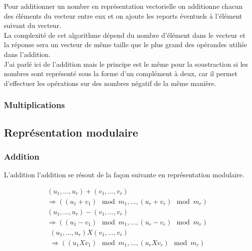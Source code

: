 \documentclass[letterpaper]{article}
\begin{document}
Pour additionner un nombre en représentation vectorielle on additionne chacun
des éléments du vecteur entre eux et on ajoute les reports éventuels à
l'élément suivant du vecteur. \\

La complexité de cet algorithme dépend du nombre d'élément dans le vecteur et
la réponse sera un vecteur de même taille que le plus grand des opérandes
utiliśe dans l'addition.\\

J'ai parlé ici de l'addition mais le principe est le même pour la soustraction
si les nombres sont représenté sous la forme d'un complément à deux, car il
permet d'effectuer les opérations sur des nombres négatif de la même
manière\cite{wikicomplementtwo}.

\subsubsection{Multiplications}



\subsection{Représentation modulaire}

\subsubsection{Addition}

L'addition l'addition se résout de la façon suivante en représentation
modulaire.

\begin{equation}
  \begin{split}
    (u_1, \dots, u_r) + (v_1, \dots, v_r) \\
     \Rightarrow ((u_1 + v_1) \mod m_1, \dots, (u_r + v_r) \mod m_r)
  \end{split}
\end{equation}
\begin{equation}
  \begin{split}
    (u_1, \dots, u_r) - (v_1, \dots, v_r) \\
      \Rightarrow ((u_1 - v_1) \mod m_1, \dots, (u_r - v_r) \mod m_r)
  \end{split}
\end{equation}
\begin{equation}
  \begin{split}
    (u_1, \dots, u_r) X (v_1, \dots, v_r) \\
      \Rightarrow ((u_1 X v_1) \mod m_1, \dots, (u_r X v_r) \mod m_r)
  \end{split}
\end{equation}
\end{document}

